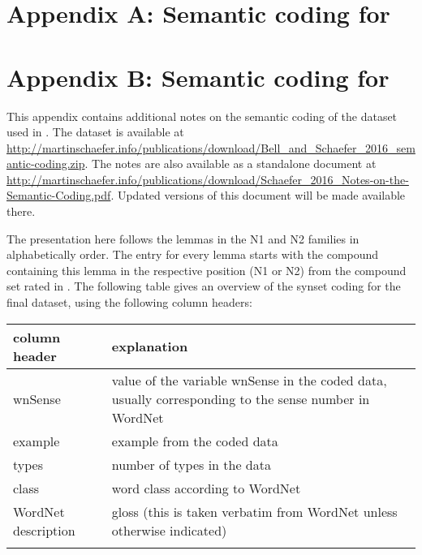 \backmatter
{}%
\chapter{Appendix A: Semantic coding for \citet{BellandSchaefer:2013}}
\label{sec:appendix_semantic-coding-2013}


\chapter{Appendix B: Semantic coding for \citet{BellandSchaefer:2016}}
\label{sec:appendix_semantic-coding-2016}

This appendix contains additional notes on the semantic coding of the dataset used in \citet{BellandSchaefer:2016}. The dataset is available at \url{http://martinschaefer.info/publications/download/Bell_and_Schaefer_2016_semantic-coding.zip}. The notes are also available as a standalone document at \url{http://martinschaefer.info/publications/download/Schaefer_2016_Notes-on-the-Semantic-Coding.pdf}. Updated versions of this document will be made available there.

The presentation here follows the lemmas in the N1 and N2 families in alphabetically order. The entry for every lemma starts with the compound containing this lemma in the respective position (N1 or N2) from the compound set rated in \citet{Reddyetal:2011}. The following table gives an overview of the synset coding for the final
dataset, using the following column headers:

\noindent
\begin{tabularx}{1\textwidth}{lQ}\lsptoprule 
column header&explanation\\\midrule
wnSense&value of the variable wnSense in the coded data, usually corresponding to the sense number in WordNet\\\tablevspace
example& example from the coded data\\\tablevspace
types&number of types in the data\\\tablevspace
class&word class according to WordNet\\\tablevspace
WordNet description&gloss (this is taken
verbatim from WordNet unless otherwise indicated)   \\\lspbottomrule
\end{tabularx}
\vspace*{2ex}

